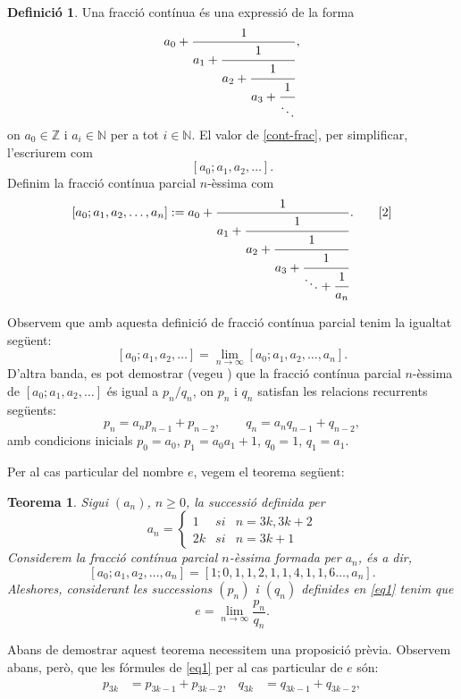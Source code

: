 \documentclass[11pt,a4paper]{article}
\newtheorem{theorem}{Teorema}
\theoremstyle{definition}
\newtheorem{definition}{Definició}
\begin{document}
\begin{enumerate}
          \begin{definition}
              Una fracció contínua és una expressió de la forma
              \begin{equation}
                  a_0+\frac{1}{a_1+\cfrac{1}{a_2+\cfrac{1}{a_3+\cfrac{1}{\ddots}}}},
                  \label{cont-frac}
              \end{equation} on $a_0\in\mathbb{Z}$ i $a_i\in\mathbb{N}$ per a tot $i\in\mathbb{N}$. El valor de \eqref{cont-frac}, per simplificar, l'escriurem com $$[a_0;a_1,a_2,\ldots].$$ Definim la fracció contínua parcial $n$-èssima com $$[a_0;a_1,a_2,\ldots,a_n]:=a_0+\frac{1}{a_1+\cfrac{1}{a_2+\cfrac{1}{a_3+\cfrac{1}{\ddots+\cfrac{1}{a_n}}}}}.\qquad\text{\cite{2}}$$
          \end{definition}
          Observem que amb aquesta definició de fracció contínua parcial tenim la igualtat següent: $$[a_0;a_1,a_2,\ldots]=\lim_{n\to\infty}[a_0;a_1,a_2,\ldots,a_n].$$ D'altra banda, es pot demostrar (vegeu \cite{4}) que la fracció contínua parcial $n$-èssima de $[a_0;a_1,a_2,\ldots]$ és igual a $p_n/q_n$, on $p_n$ i $q_n$ satisfan les relacions recurrents següents:
          \begin{equation}
              p_n=a_np_{n-1}+p_{n-2},\qquad q_n=a_nq_{n-1}+q_{n-2},
              \label{eq1}
          \end{equation}
          amb condicions inicials $p_0=a_0$, $p_1=a_0a_1+1$, $q_0=1$, $q_1=a_1$.\par Per al cas particular del nombre $e$, vegem el teorema següent:
          \begin{theorem}
              Sigui $(a_n)$, $n\geq 0$, la successió definida per $$a_n=\left\{\begin{array}{ccc}
                      1  & si & n=3k,3k+2 \\[3pt]
                      2k & si & n=3k+1
                  \end{array}\right.$$ Considerem la fracció contínua parcial $n$-èssima formada per $a_n$, és a dir, $$[a_0;a_1,a_2,\ldots,a_n]=[1;0,1,1,2,1,1,4,1,1,6\ldots,a_n].$$ Aleshores, considerant les successions $(p_n)$ i $(q_n)$ definides en \eqref{eq1} tenim que $$e=\lim_{n\to\infty}\frac{p_n}{q_n}.$$
          \end{theorem}
          Abans de demostrar aquest teorema necessitem una proposició prèvia. Observem abans, però, que les fórmules de \eqref{eq1} per al cas particular de $e$ són:
          \begin{align*}
              p_{3k}   & =p_{3k-1}+p_{3k-2}, & q_{3k}   & =q_{3k-1}+q_{3k-2}, \\

\end{align*}
\end{enumerate}
\end{document}
